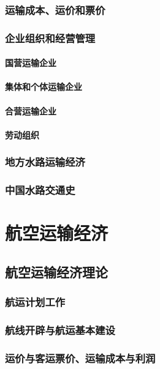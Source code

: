 \documentclass[UTF8]{../../RepresentationUniverse}
\begin{document}
    \subsection{运输成本、运价和票价}
    \subsection{企业组织和经营管理}
        \subsubsection{国营运输企业}
        \subsubsection{集体和个体运输企业}
        \subsubsection{合营运输企业}
        \subsubsection{劳动组织}
    \subsection{地方水路运输经济}
    \subsection{中国水路交通史}




\chapter{航空运输经济}
\section{航空运输经济理论}
    \subsection{航运计划工作}
    \subsection{航线开辟与航运基本建设}
    \subsection{运价与客运票价、运输成本与利润}
\end{document}
